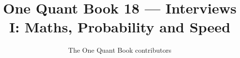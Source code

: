 \documentclass[11pt,a4paper,twoside,openany]{book}
\title{One Quant Book 18 --- Interviews I: Maths, Probability and Speed}
\author{The One Quant Book contributors}
\date{\bookdate}
\begin{document}
\frontmatter



\tableofcontents

\mainmatter


\appendix
\part{\omsolutionspart}


\backmatter
\printindex
\end{document}
